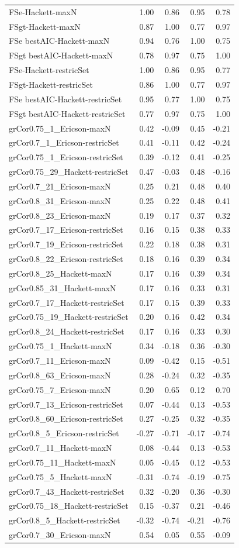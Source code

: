 {\begin{landscape}
\begin{footnotesize}
\begin{longtable}{@{}l|rrrr@{}}
FSe-Hackett-maxN                   & 1.00 & 0.86 & 0.95 & 0.78 \tabularnewline
FSgt-Hackett-maxN                  & 0.87 & 1.00 & 0.77 & 0.97 \tabularnewline
FSe bestAIC-Hackett-maxN           & 0.94 & 0.76 & 1.00 & 0.75 \tabularnewline
FSgt bestAIC-Hackett-maxN          & 0.78 & 0.97 & 0.75 & 1.00 \tabularnewline
FSe-Hackett-restricSet             & 1.00 & 0.86 & 0.95 & 0.77 \tabularnewline
FSgt-Hackett-restricSet            & 0.86 & 1.00 & 0.77 & 0.97 \tabularnewline
FSe bestAIC-Hackett-restricSet     & 0.95 & 0.77 & 1.00 & 0.75 \tabularnewline
FSgt bestAIC-Hackett-restricSet    & 0.77 & 0.97 & 0.75 & 1.00 \tabularnewline
grCor0.75\_1\_Ericson-maxN         & 0.42 & -0.09 & 0.45 & -0.21 \tabularnewline
grCor0.7\_1\_Ericson-restricSet    & 0.41 & -0.11 & 0.42 & -0.24 \tabularnewline
grCor0.75\_1\_Ericson-restricSet   & 0.39 & -0.12 & 0.41 & -0.25 \tabularnewline
grCor0.75\_29\_Hackett-restricSet  & 0.47 & -0.03 & 0.48 & -0.16 \tabularnewline
grCor0.7\_21\_Ericson-maxN         & 0.25 & 0.21 & 0.48 & 0.40 \tabularnewline
grCor0.8\_31\_Ericson-maxN         & 0.25 & 0.22 & 0.48 & 0.41 \tabularnewline
grCor0.8\_23\_Ericson-maxN         & 0.19 & 0.17 & 0.37 & 0.32 \tabularnewline
grCor0.7\_17\_Ericson-restricSet   & 0.16 & 0.15 & 0.38 & 0.33 \tabularnewline
grCor0.7\_19\_Ericson-restricSet   & 0.22 & 0.18 & 0.38 & 0.31 \tabularnewline
grCor0.8\_22\_Ericson-restricSet   & 0.18 & 0.16 & 0.39 & 0.34 \tabularnewline
grCor0.8\_25\_Hackett-maxN         & 0.17 & 0.16 & 0.39 & 0.34 \tabularnewline
grCor0.85\_31\_Hackett-maxN        & 0.17 & 0.16 & 0.33 & 0.31 \tabularnewline
grCor0.7\_17\_Hackett-restricSet   & 0.17 & 0.15 & 0.39 & 0.33 \tabularnewline
grCor0.75\_19\_Hackett-restricSet  & 0.20 & 0.16 & 0.42 & 0.34 \tabularnewline
grCor0.8\_24\_Hackett-restricSet   & 0.17 & 0.16 & 0.33 & 0.30 \tabularnewline
grCor0.75\_1\_Hackett-maxN         & 0.34 & -0.18 & 0.36 & -0.30 \tabularnewline
grCor0.7\_11\_Ericson-maxN         & 0.09 & -0.42 & 0.15 & -0.51 \tabularnewline
grCor0.8\_63\_Ericson-maxN         & 0.28 & -0.24 & 0.32 & -0.35 \tabularnewline
grCor0.75\_7\_Ericson-maxN         & 0.20 & 0.65 & 0.12 & 0.70 \tabularnewline
grCor0.7\_13\_Ericson-restricSet   & 0.07 & -0.44 & 0.13 & -0.53 \tabularnewline
grCor0.8\_60\_Ericson-restricSet   & 0.27 & -0.25 & 0.32 & -0.35 \tabularnewline
grCor0.8\_5\_Ericson-restricSet    & -0.27 & -0.71 & -0.17 & -0.74 \tabularnewline
grCor0.7\_11\_Hackett-maxN         & 0.08 & -0.44 & 0.13 & -0.53 \tabularnewline
grCor0.75\_11\_Hackett-maxN        & 0.05 & -0.45 & 0.12 & -0.53 \tabularnewline
grCor0.75\_5\_Hackett-maxN         & -0.31 & -0.74 & -0.19 & -0.75 \tabularnewline
grCor0.7\_43\_Hackett-restricSet   & 0.32 & -0.20 & 0.36 & -0.30 \tabularnewline
grCor0.75\_18\_Hackett-restricSet  & 0.15 & -0.37 & 0.21 & -0.46 \tabularnewline
grCor0.8\_5\_Hackett-restricSet    & -0.32 & -0.74 & -0.21 & -0.76 \tabularnewline
grCor0.7\_30\_Ericson-maxN         & 0.54 & 0.05 & 0.55 & -0.09 \tabularnewline
\bottomrule
\end{longtable}
\end{footnotesize}
\end{landscape}
\clearpage%
}

